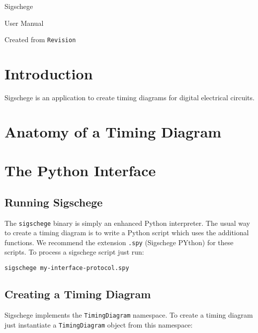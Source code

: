 \documentclass[11pt]{article}
\begin{document}
\begin{center}
\Huge Sigschege

\vspace{1cm}

\LARGE User Manual

\vspace{3cm}

Created from \verb$Revision$
  
\end{center}

\eject

\section{Introduction}
\label{sec:intro}

Sigschege is an application to create timing diagrams for digital electrical circuits.



\section{Anatomy of a Timing Diagram}
\label{sec:anatomy}



\section{The Python Interface}
\label{sec:python}

\subsection{Running Sigschege}

The \texttt{sigschege} binary is simply an enhanced Python interpreter. The
usual way to create a timing diagram is to write a Python script which uses the
additional functions. We recommend the extension \texttt{.spy} (Sigschege PYthon) for these
scripts. To process a sigschege script just run:

\begin{center}
  \texttt{sigschege my-interface-protocol.spy}
\end{center}


\subsection{Creating a Timing Diagram}

Sigschege implements the \texttt{TimingDiagram} namespace. To create a timing
diagram just instantiate a \texttt{TimingDiagram} object from this namespace:
\end{document}
